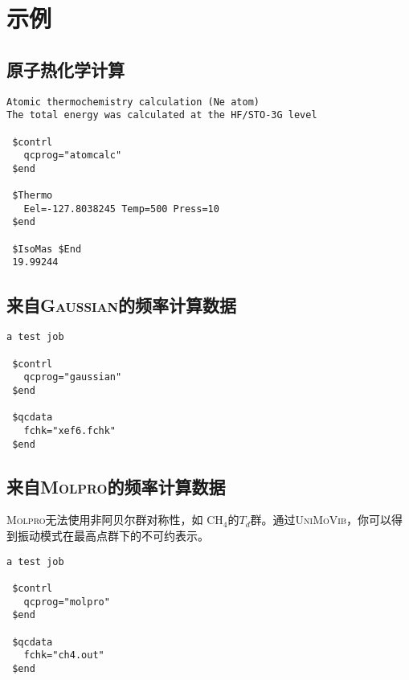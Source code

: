 \documentclass[12pt,a4paper,openany,twoside,cap]{ctexbook}
\begin{document}
\chapter{示例} \label{part:examp}

\section{原子热化学计算} \label{sec:exp1}

\begin{colorboxed}[oval=false,boxcolor=green!75!black,bgcolor=green!5!white]
\ttfamily\footnotesize
\begin{lstlisting}
Atomic thermochemistry calculation (Ne atom)
The total energy was calculated at the HF/STO-3G level

 $contrl
   qcprog="atomcalc"
 $end

 $Thermo
   Eel=-127.8038245 Temp=500 Press=10
 $end

 $IsoMas $End
 19.99244
\end{lstlisting}\end{colorboxed}

\section{来自\textsc{Gaussian}的频率计算数据} \label{sec:exp2}

\begin{colorboxed}[oval=false,boxcolor=green!75!black,bgcolor=green!5!white]
\ttfamily\footnotesize
\begin{lstlisting}
a test job

 $contrl
   qcprog="gaussian"
 $end

 $qcdata
   fchk="xef6.fchk"
 $end
\end{lstlisting}\end{colorboxed}

\section{来自\textsc{Molpro}的频率计算数据} \label{sec:exp3}

\textsc{Molpro}无法使用非阿贝尔群对称性，如 CH$_4$的$T_d$群。通过\textsc{UniMoVib}，你可以得到振动模式在最高点群下的不可约表示。

\begin{colorboxed}[oval=false,boxcolor=green!75!black,bgcolor=green!5!white]
\ttfamily\footnotesize
\begin{lstlisting}
a test job

 $contrl
   qcprog="molpro"
 $end

 $qcdata
   fchk="ch4.out"
 $end
\end{lstlisting}\end{colorboxed}
\end{document}
